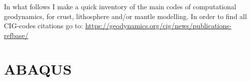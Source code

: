 
In what follows I make a quick inventory of the main codes of computational geodynamics, 
for crust, lithosphere and/or mantle modelling.
In order to find all CIG-codes citations go to: 
\url{https://geodynamics.org/cig/news/publications-refbase/}


\section{ABAQUS} 

